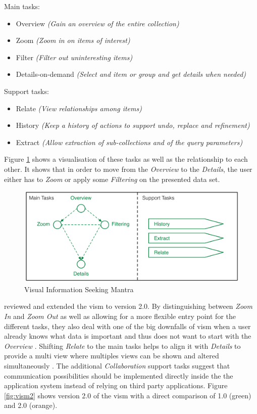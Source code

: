 Main tasks:
\begin{itemize}[noitemsep,nolistsep]
	\item Overview \textit{(Gain an overview of the entire collection)}
	\item Zoom \textit{(Zoom in on items of interest)}
	\item Filter \textit{(Filter out uninteresting items)}
	\item Details-on-demand \textit{(Select and item or group and get details when needed)}
\end{itemize}
Support tasks:
\begin{itemize}[noitemsep,nolistsep]
	\item Relate \textit{(View relationships among items)}
	\item History \textit{(Keep a history of actions to support undo, replace and refinement)}
	\item Extract \textit{(Allow extraction of sub-collections and of the query parameters)}
\end{itemize}
Figure \ref{fig:vism} shows a visualisation of these tasks as well as the relationship to each other. It shows that in order to move from the \textit{Overview} to the \textit{Details}, the user either has to \textit{Zoom} or apply some \textit{Filtering} on the presented data set.
\begin{figure}[h!]
	\begin{center}
		\includegraphics[width=12cm]{03_Figures/05_LitReview/Stauffer2016_VISM1.png}
		\caption[Visual Information Seeking Mantra]{Visual Information Seeking Mantra \citep{Stauffer2016}}
		\label{fig:vism}
	\end{center}
\end{figure} \newline
\cite{Stauffer2016} reviewed and extended the \gls{vism} to version 2.0. By distinguishing between \textit{Zoom In} and \textit{Zoom Out} as well as allowing for a more flexible entry point for the different tasks, they also deal with one of the big downfalls of \gls{vism} when a user already knows what data is important and thus does not want to start with the \textit{Overview} \citep{Neil2006}. Shifting \textit{Relate} to the main tasks helps to align it with \textit{Details} to provide a multi view where multiples views can be shown and altered simultaneously \citep{Stauffer2016}. The additional \textit{Collaboration} support tasks suggest that communication possibilities should be implemented directly inside the the application system instead of relying on third party applications. Figure \ref{fig:vism2} shows version 2.0 of the \gls{vism} with a direct comparison of 1.0 (green) and 2.0 (orange). \newline
